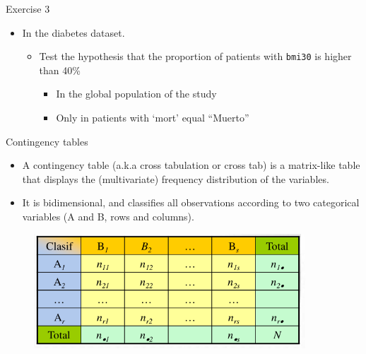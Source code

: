 \documentclass[
  ignorenonframetext,
]{beamer}
\providecommand{\tightlist}{%
  \setlength{\itemsep}{0pt}\setlength{\parskip}{0pt}}
\begin{document}
\begin{frame}[fragile]{Exercise 3}
\protect\hypertarget{exercise-3}{}
\begin{itemize}
\item
  In the diabetes dataset.

  \begin{itemize}
  \tightlist
  \item
    Test the hypothesis that the proportion of patients with
    \texttt{bmi30} is higher than 40\%

    \begin{itemize}
    \tightlist
    \item
      In the global population of the study
    \item
      Only in patients with `mort' equal ``Muerto''
    \end{itemize}
  \end{itemize}
\end{itemize}
\end{frame}

\begin{frame}{Contingency tables}
\protect\hypertarget{contingency-tables}{}
\begin{itemize}
\item
  A contingency table (a.k.a cross tabulation or cross tab) is a
  matrix-like table that displays the (multivariate) frequency
  distribution of the variables.
\item
  It is bidimensional, and classifies all observations according to two
  categorical variables (A and B, rows and columns).
\end{itemize}

\begin{figure}
\includegraphics[width=0.8\linewidth]{images/contingencytables1} \end{figure}
\end{frame}
\end{document}
